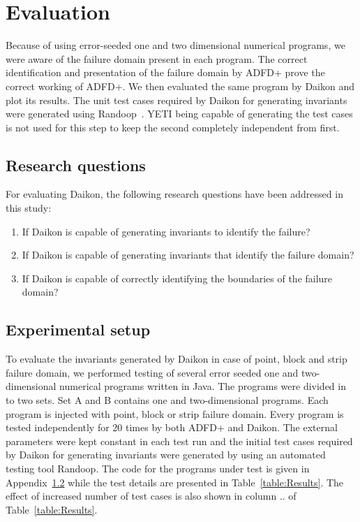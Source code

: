 \documentclass{acm_proc_article-sp}
\begin{document}


\section{Evaluation}\label{sec:eval}
Because of using error-seeded one and two dimensional numerical programs, we were aware of the failure domain present in each program. The correct identification and presentation of the failure domain by ADFD+ prove the correct working of ADFD+. We then evaluated the same program by Daikon and plot its results. The unit test cases required by Daikon for generating invariants were generated using Randoop~\cite{}. YETI being capable of generating the test cases is not used for this step to keep the second completely independent from first. 

\subsection{Research questions}
For evaluating Daikon, the following research questions have been addressed in this study:
\begin{enumerate}
\item If Daikon is capable of generating invariants to identify the failure?
\item If Daikon is capable of generating invariants that identify the failure domain?
\item If Daikon is capable of correctly identifying the boundaries of the failure domain?
\end{enumerate}

\subsection{Experimental setup}
To evaluate the invariants generated by Daikon in case of point, block and strip failure domain, we performed testing of several error seeded one and two-dimensional numerical programs written in Java. The programs were divided in to two sets. Set A and B contains one and two-dimensional programs. Each program is injected with point, block or strip failure domain. Every program is tested independently for 20 times by both ADFD+ and Daikon. The external parameters were kept constant in each test run and the initial test cases required by Daikon for generating invariants were generated by using an automated testing tool Randoop. The code for the programs under test is given in Appendix~\ref{} while the test details are presented in Table~\ref{table:Results}. The effect of increased number of test cases is also shown in column .. of Table~\ref{table:Results}.
\end{document}
